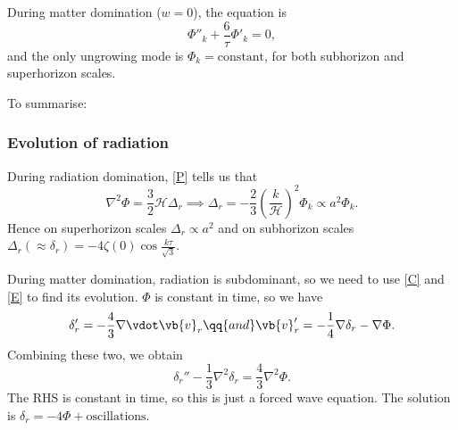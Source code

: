 \documentclass{jknotes}
\begin{document}
During matter domination (\(w=0\)), the equation is
\begin{equation}
    \Phi''_k + \frac{6}{\tau}\Phi'_k=0,
\end{equation}
and the only ungrowing mode is \(\Phi_k=\text{constant}\), for both subhorizon and superhorizon scales.

To summarise:
\begin{figure}[H]
    \centering
\end{figure}

\subsubsection*{Evolution of radiation}
During radiation domination, \eqref{P} tells us that
\begin{equation}
    \nabla^2\Phi = \frac32\mathcal{H}\Delta_r \implies \Delta_r = -\frac23\left(\frac{k}{\mathcal{H}}\right)^2\Phi_k \propto a^2\Phi_k.
\end{equation}
Hence on superhorizon scales \(\Delta_r \propto a^2\) and on subhorizon scales \(\Delta_r(\approx\delta_r) = -4\zeta(0)\cos\frac{k\tau}{\sqrt{3}}\).

During matter domination, radiation is subdominant, so we need to use \eqref{C} and \eqref{E} to find its evolution. \(\Phi\) is constant in time, so we have
\begin{equation}
    \delta_r'=-\frac43\nabla\vdot\vb{v}_r \qq{and} \vb{v}_r'=-\frac14\nabla\delta_r - \nabla\Phi.
\end{equation}
Combining these two, we obtain
\begin{equation}
    \delta_r'' - \frac13\nabla^2\delta_r = \frac43\nabla^2\Phi.
\end{equation}
The RHS is constant in time, so this is just a forced wave equation. The solution is \(\delta_r = -4\Phi + \text{oscillations}\).
\end{document}
